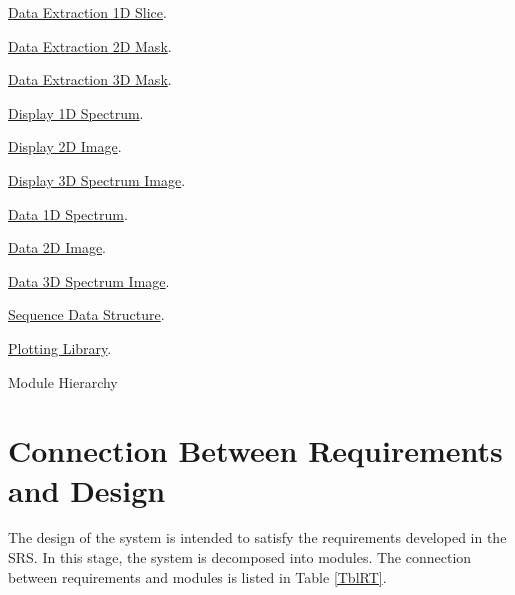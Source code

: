 \documentclass[12pt, titlepage]{article}
\newcounter{mnum}
\newcommand{\mthemnum}{M\themnum}
\begin{document}
\begin{description}
    \hyperref[sssec:Extract1D]{Data Extraction 1D Slice}.
	\item [\refstepcounter{mnum} \mthemnum \label{m2Dmask}:]
    \hyperref[sssec:Extract2D]{Data Extraction 2D Mask}.
	\item [\refstepcounter{mnum} \mthemnum \label{m3Dmask}:]
    \hyperref[sssec:Extract3D]{Data Extraction 3D Mask}.
	\item [\refstepcounter{mnum} \mthemnum \label{m1Dspecdisplay}:]
    \hyperref[sssec:Plot1D]{Display 1D Spectrum}.
	\item [\refstepcounter{mnum} \mthemnum \label{m2Dimgdisplay}:]
    \hyperref[sssec:Plot2D]{Display 2D Image}.
	\item [\refstepcounter{mnum} \mthemnum \label{m3DSIdisplay}:]
    \hyperref[sssec:Plot3D]{Display 3D Spectrum Image}.
	\item [\refstepcounter{mnum} \mthemnum \label{m1Dspecdata}:]
    \hyperref[sssec:Data1D]{Data 1D Spectrum}.
	\item [\refstepcounter{mnum} \mthemnum \label{m2Dimgdata}:]
    \hyperref[sssec:Data2D]{Data 2D Image}.
	\item [\refstepcounter{mnum} \mthemnum \label{m3DSIdata}:]
    \hyperref[sssec:Data3D]{Data 3D Spectrum Image}.
	\item [\refstepcounter{mnum} \mthemnum \label{mSeqStruct}:]
    \hyperref[sssec:SeqStruct]{Sequence Data Structure}. 
	\item [\refstepcounter{mnum} \mthemnum \label{mPlotLib}:]
    \hyperref[sssec:PlotLib]{Plotting Library}.
\end{description}

\begin{table}[h!]
\centering

\caption{Module Hierarchy}
\label{TblMH}
\end{table}

\section{Connection Between Requirements and Design} \label{SecConnection}

The design of the system is intended to satisfy the requirements developed in
the SRS. In this stage, the system is decomposed into modules. The connection
between requirements and modules is listed in Table \ref{TblRT}.
\end{document}
